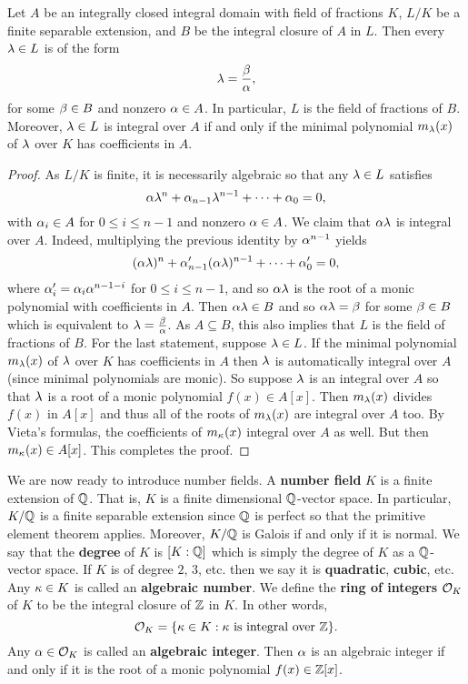     \begin{proposition}\label{prop:field_of_fractions_AKBL}
      Let $A$ be an integrally closed integral domain with field of fractions $K$, $L/K$ be a finite separable extension, and $B$ be the integral closure of $A$ in $L$. Then every $\lambda \in L$ is of the form
      \[
        \lambda = \frac{\beta}{\alpha},
      \]
      for some $\beta \in B$ and nonzero $\alpha \in A$. In particular, $L$ is the field of fractions of $B$. Moreover, $\lambda \in L$ is integral over $A$ if and only if the minimal polynomial $m_{\lambda}(x)$ of $\lambda$ over $K$ has coefficients in $A$.
    \end{proposition}
    \begin{proof}
      As $L/K$ is finite, it is necessarily algebraic so that any $\lambda \in L$ satisfies
      \[
        \alpha\lambda^{n}+\alpha_{n-1}\lambda^{n-1}+\cdots+\alpha_{0} = 0,
      \]
      with $\alpha_{i} \in A$ for $0 \le i \le n-1$ and nonzero $\alpha \in A$. We claim that $\alpha\lambda$ is integral over $A$. Indeed, multiplying the previous identity by $\alpha^{n-1}$ yields
      \[
        (\alpha\lambda)^{n}+\alpha'_{n-1}(\alpha\lambda)^{n-1}+\cdots+\alpha'_{0} = 0,
      \]
      where $\alpha'_{i} = \alpha_{i}\alpha^{n-1-i}$ for $0 \le i \le n-1$, and so $\alpha\lambda$ is the root of a monic polynomial with coefficients in $A$. Then $\alpha\lambda \in B$ and so $\alpha\lambda = \beta$ for some $\beta \in B$ which is equivalent to $\lambda = \frac{\beta}{\alpha}$. As $A \subseteq B$, this also implies that $L$ is the field of fractions of $B$. For the last statement, suppose $\lambda \in L$. If the minimal polynomial $m_{\lambda}(x)$ of $\lambda$ over $K$ has coefficients in $A$ then $\lambda$ is automatically integral over $A$ (since minimal polynomials are monic). So suppose $\lambda$ is an integral over $A$ so that $\lambda$ is a root of a monic polynomial $f(x) \in A[x]$. Then $m_{\lambda}(x)$ divides $f(x)$ in $A[x]$ and thus all of the roots of $m_{\lambda}(x)$ are integral over $A$ too. By Vieta's formulas, the coefficients of $m_{\kappa}(x)$ integral over $A$ as well. But then $m_{\kappa}(x) \in A[x]$. This completes the proof.
    \end{proof}

    We are now ready to introduce number fields. A \textbf{number field} $K$ is a finite extension of $\mathbb{Q}$. That is, $K$ is a finite dimensional $\mathbb{Q}$-vector space. In particular, $K/\mathbb{Q}$ is a finite separable extension since $\mathbb{Q}$ is perfect so that the primitive element theorem applies. Moreover, $K/\mathbb{Q}$ is Galois if and only if it is normal. We say that the \textbf{degree} of $K$ is $[K:\mathbb{Q}]$ which is simply the degree of $K$ as a $\mathbb{Q}$-vector space. If $K$ is of degree $2$, $3$, etc. then we say it is \textbf{quadratic}, \textbf{cubic}, etc. Any $\kappa \in K$ is called an \textbf{algebraic number}. We define the \textbf{ring of integers} $\mathcal{O}_{K}$ of $K$ to be the integral closure of $\mathbb{Z}$ in $K$. In other words,
    \[
      \mathcal{O}_{K} = \{\kappa \in K:\text{$\kappa$ is integral over $\mathbb{Z}$}\}.
    \]
    Any $\alpha \in \mathcal{O}_{K}$ is called an \textbf{algebraic integer}. Then $\alpha$ is an algebraic integer if and only if it is the root of a monic polynomial $f(x) \in \mathbb{Z}[x]$.

